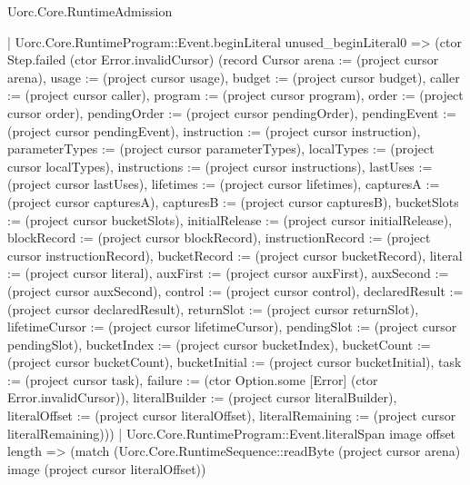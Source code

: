 \begin{lexlean}{Uorc.Core.RuntimeAdmission}
\begin{semanticmodule}
{          | Uorc.Core.RuntimeProgram::Event.beginLiteral unused_beginLiteral0 => (ctor Step.failed (ctor Error.invalidCursor) (record Cursor {arena := (project cursor arena), usage := (project cursor usage), budget := (project cursor budget), caller := (project cursor caller), program := (project cursor program), order := (project cursor order), pendingOrder := (project cursor pendingOrder), pendingEvent := (project cursor pendingEvent), instruction := (project cursor instruction), parameterTypes := (project cursor parameterTypes), localTypes := (project cursor localTypes), instructions := (project cursor instructions), lastUses := (project cursor lastUses), lifetimes := (project cursor lifetimes), capturesA := (project cursor capturesA), capturesB := (project cursor capturesB), bucketSlots := (project cursor bucketSlots), initialRelease := (project cursor initialRelease), blockRecord := (project cursor blockRecord), instructionRecord := (project cursor instructionRecord), bucketRecord := (project cursor bucketRecord), literal := (project cursor literal), auxFirst := (project cursor auxFirst), auxSecond := (project cursor auxSecond), control := (project cursor control), declaredResult := (project cursor declaredResult), returnSlot := (project cursor returnSlot), lifetimeCursor := (project cursor lifetimeCursor), pendingSlot := (project cursor pendingSlot), bucketIndex := (project cursor bucketIndex), bucketCount := (project cursor bucketCount), bucketInitial := (project cursor bucketInitial), task := (project cursor task), failure := (ctor Option.some [Error] (ctor Error.invalidCursor)), literalBuilder := (project cursor literalBuilder), literalOffset := (project cursor literalOffset), literalRemaining := (project cursor literalRemaining)}))
          | Uorc.Core.RuntimeProgram::Event.literalSpan image offset length => (match (Uorc.Core.RuntimeSequence::readByte (project cursor arena) image (project cursor literalOffset))
}
\end{semanticmodule}
\end{lexlean}
